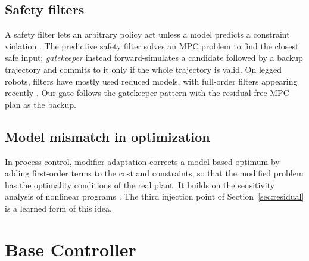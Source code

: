 \documentclass[conference]{IEEEtran}
\begin{document}
\subsection{Safety filters}
A safety filter lets an arbitrary policy act unless a model predicts a constraint violation \cite{alshiekh2018shielding,ames2019cbf,hewing2020lbmpc,brunke2022safe}.
The predictive safety filter \cite{wabersich2021psf} solves an MPC problem to find the closest safe input; \emph{gatekeeper} \cite{agrawal2024gatekeeper} instead forward-simulates a candidate followed by a backup trajectory and commits to it only if the whole trajectory is valid.
On legged robots, filters have mostly used reduced models, with full-order filters appearing recently \cite{nguyen2024gameplay}.
Our gate follows the gatekeeper pattern with the residual-free MPC plan as the backup.

\subsection{Model mismatch in optimization}
In process control, modifier adaptation \cite{marchetti2009modifier} corrects a model-based optimum by adding first-order terms to the cost and constraints, so that the modified problem has the optimality conditions of the real plant.
It builds on the sensitivity analysis of nonlinear programs \cite{fiacco1983sensitivity}.
The third injection point of Section~\ref{sec:residual} is a learned form of this idea.

\section{Base Controller}
\label{sec:base}
\end{document}
